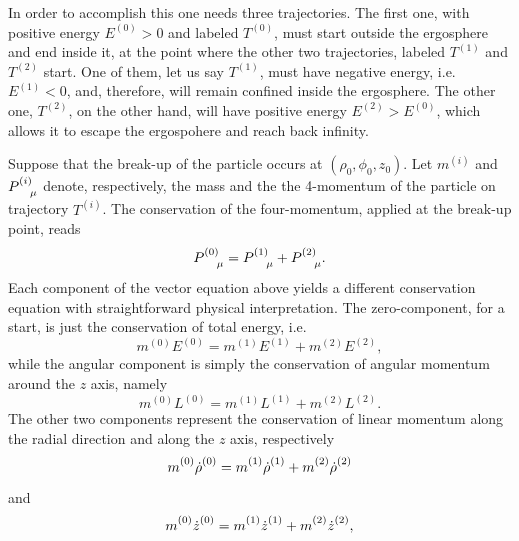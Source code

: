 In order to accomplish this one needs three trajectories. The first one, with positive energy $E^{(0)} > 0$ and labeled $T^{(0)}$, must start outside the ergosphere and end inside it, at the point where the other two trajectories, labeled $T^{(1)}$ and $T^{(2)}$ start. One of them, let us say $T^{(1)}$, must have negative energy, i.e.~$E^{(1)}<0$, and, therefore, will remain confined inside the ergosphere. The other one, $T^{(2)}$, on the other hand, will have positive energy $E^{(2)} > E^{(0)}$, which allows it to escape the ergospohere and reach back infinity.

Suppose that the break-up of the particle occurs at $(\rho_0,\phi_0,z_0)$. Let $m^{(i)}$ and $\tens{P}{(i)}{\mu}$ denote, respectively, the mass and the the 4-momentum of the particle on trajectory $T^{(i)}$. The conservation of the four-momentum, applied at the break-up point, reads
\begin{equation}
    \tens{P}{(0)}{\mu} = \tens{P}{(1)}{\mu} + \tens{P}{(2)}{\mu}.
    \label{ch:penrose_binaries/eq:four_momentum_conservation}
\end{equation}
%
Each component of the vector equation above yields a different conservation equation with straightforward physical interpretation. The zero-component, for a start, is just the conservation of total energy, i.e.
\begin{equation}
    m^{(0)}E^{(0)} = m^{(1)}E^{(1)} + m^{(2)}E^{(2)},
    \label{ch:penrose_binaries/eq:conservation_of_charge_energy}
\end{equation}
while the angular component is simply the conservation of angular momentum around the $z$ axis, namely
\begin{equation}
    m^{(0)}L^{(0)} = m^{(1)}L^{(1)} + m^{(2)}L^{(2)}.
    \label{ch:penrose_binaries/eq:conservation_ang_mom}
\end{equation}
The other two components represent the conservation of linear momentum along the radial direction and along the $z$ axis, respectively
\begin{equation}
    \tens{m}{(0)}{}\tens{\dot{\rho}}{(0)}{} = \tens{m}{(1)}{}\tens{\dot{\rho}}{(1)}{} + \tens{m}{(2)}{}\tens{\dot{\rho}}{(2)}{}
    \label{ch:penrose_binaries/eq:conservation_rho}
\end{equation}
%
and
%
\begin{equation}
    \tens{m}{(0)}{}\tens{\dot{z}}{(0)}{} = \tens{m}{(1)}{}\tens{\dot{z}}{(1)}{} + \tens{m}{(2)}{}\tens{\dot{z}}{(2)}{},
    \label{ch:penrose_binaries/eq:conservation_z}
\end{equation}

